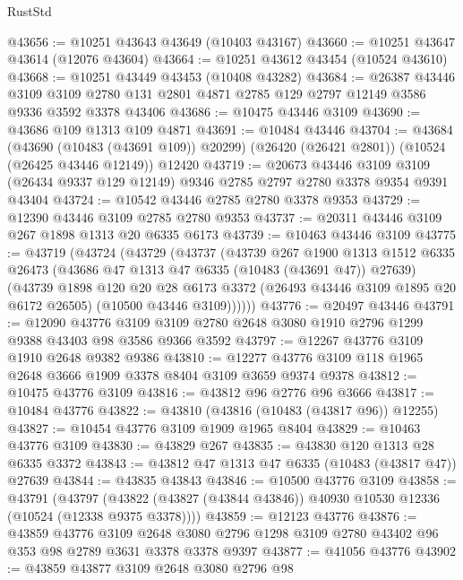 \begin{lexlean}{RustStd}
\begin{coremodule}
@43656 := @10251 @43643 @43649 (@10403 @43167)
@43660 := @10251 @43647 @43614 (@12076 @43604)
@43664 := @10251 @43612 @43454 (@10524 @43610)
@43668 := @10251 @43449 @43453 (@10408 @43282)
@43684 := @26387
    @43446
    @3109
    @3109
    @2780
    @131
    @2801
    @4871
    @2785
    @129
    @2797
    @12149
    @3586
    @9336
    @3592
    @3378
    @43406
@43686 := @10475 @43446 @3109
@43690 := @43686 @109 @1313 @109 @4871
@43691 := @10484 @43446
@43704 := @43684
    (@43690 (@10483 (@43691 @109)) @20299)
    (@26420 (@26421 @2801))
    (@10524 (@26425 @43446 @12149))
    @12420
@43719 := @20673
    @43446
    @3109
    @3109
    (@26434 @9337 @129 @12149)
    @9346
    @2785
    @2797
    @2780
    @3378
    @9354
    @9391
    @43404
@43724 := @10542 @43446 @2785 @2780 @3378 @9353
@43729 := @12390 @43446 @3109 @2785 @2780 @9353
@43737 := @20311 @43446 @3109 @267 @1898 @1313 @20 @6335 @6173
@43739 := @10463 @43446 @3109
@43775 := @43719
    (@43724
      (@43729
        (@43737
          (@43739
            @267
            @1900
            @1313
            @1512
            @6335
            @26473
            (@43686 @47 @1313 @47 @6335 (@10483 (@43691 @47)) @27639)
            (@43739
              @1898
              @120
              @20
              @28
              @6173
              @3372
              (@26493 @43446 @3109 @1895 @20 @6172 @26505)
              (@10500 @43446 @3109))))))
@43776 := @20497 @43446
@43791 := @12090
    @43776
    @3109
    @3109
    @2780
    @2648
    @3080
    @1910
    @2796
    @1299
    @9388
    @43403
    @98
    @3586
    @9366
    @3592
@43797 := @12267 @43776 @3109 @1910 @2648 @9382 @9386
@43810 := @12277 @43776 @3109 @118 @1965 @2648 @3666 @1909 @3378 @8404 @3109 @3659 @9374 @9378
@43812 := @10475 @43776 @3109
@43816 := @43812 @96 @2776 @96 @3666
@43817 := @10484 @43776
@43822 := @43810 (@43816 (@10483 (@43817 @96)) @12255)
@43827 := @10454 @43776 @3109 @1909 @1965 @8404
@43829 := @10463 @43776 @3109
@43830 := @43829 @267
@43835 := @43830 @120 @1313 @28 @6335 @3372
@43843 := @43812 @47 @1313 @47 @6335 (@10483 (@43817 @47)) @27639
@43844 := @43835 @43843
@43846 := @10500 @43776 @3109
@43858 := @43791
    (@43797 (@43822 (@43827 (@43844 @43846)) @40930 @10530 @12336 (@10524 (@12338 @9375 @3378))))
@43859 := @12123 @43776
@43876 := @43859
    @43776
    @3109
    @2648
    @3080
    @2796
    @1298
    @3109
    @2780
    @43402
    @96
    @353
    @98
    @2789
    @3631
    @3378
    @3378
    @9397
@43877 := @41056 @43776
@43902 := @43859
    @43877
    @3109
    @2648
    @3080
    @2796
    @98

\end{coremodule}
\end{lexlean}
